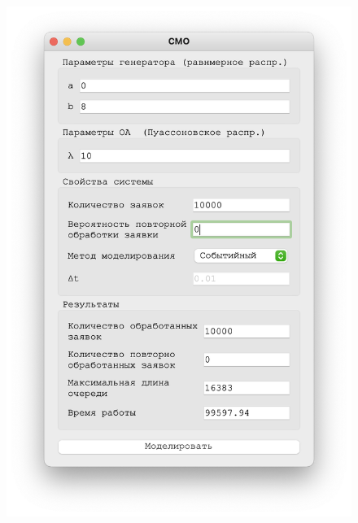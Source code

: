  \begin{figure}[!htb]
    \begin{minipage}{0.55\textwidth}
      \centering
      \includegraphics[width=1\linewidth]{10-0-s}
    \end{minipage}\hfill
    \begin{minipage}{0.55\textwidth}
      \centering

\end{minipage}
\end{figure}

